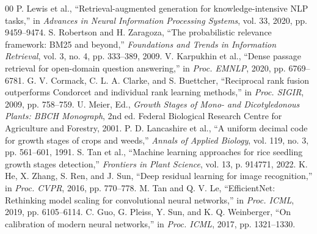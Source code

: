 \documentclass[conference]{IEEEtran}
\begin{document}
\begin{thebibliography}{00}
 P. Lewis et al., ``Retrieval-augmented generation for knowledge-intensive NLP tasks,'' in \emph{Advances in Neural Information Processing Systems}, vol. 33, 2020, pp. 9459--9474.
 S. Robertson and H. Zaragoza, ``The probabilistic relevance framework: BM25 and beyond,'' \emph{Foundations and Trends in Information Retrieval}, vol. 3, no. 4, pp. 333--389, 2009.
 V. Karpukhin et al., ``Dense passage retrieval for open-domain question answering,'' in \emph{Proc. EMNLP}, 2020, pp. 6769--6781.
 G. V. Cormack, C. L. A. Clarke, and S. Buettcher, ``Reciprocal rank fusion outperforms Condorcet and individual rank learning methods,'' in \emph{Proc. SIGIR}, 2009, pp. 758--759.
 U. Meier, Ed., \emph{Growth Stages of Mono- and Dicotyledonous Plants: BBCH Monograph}, 2nd ed. Federal Biological Research Centre for Agriculture and Forestry, 2001.
 P. D. Lancashire et al., ``A uniform decimal code for growth stages of crops and weeds,'' \emph{Annals of Applied Biology}, vol. 119, no. 3, pp. 561--601, 1991.
 S. Tan et al., ``Machine learning approaches for rice seedling growth stages detection,'' \emph{Frontiers in Plant Science}, vol. 13, p. 914771, 2022.
 K. He, X. Zhang, S. Ren, and J. Sun, ``Deep residual learning for image recognition,'' in \emph{Proc. CVPR}, 2016, pp. 770--778.
 M. Tan and Q. V. Le, ``EfficientNet: Rethinking model scaling for convolutional neural networks,'' in \emph{Proc. ICML}, 2019, pp. 6105--6114.
 C. Guo, G. Pleiss, Y. Sun, and K. Q. Weinberger, ``On calibration of modern neural networks,'' in \emph{Proc. ICML}, 2017, pp. 1321--1330.
\end{thebibliography}
\end{document}
